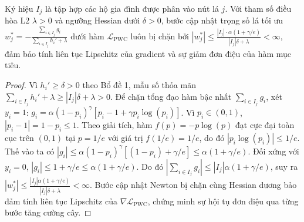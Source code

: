 \documentclass[conference]{IEEEtran}
\begin{document}
\begin{lemma}
Ký hiệu $I_j$ là tập hợp các hộ gia đình được phân vào nút lá $j$. Với tham số điều hòa L2 $\lambda > 0$ và ngưỡng Hessian dưới $\delta > 0$, bước cập nhật trọng số lá tối ưu $w_j^* = -\frac{\sum_{i \in I_j} g_i}{\sum_{i \in I_j} h_i' + \lambda}$ dưới hàm $\mathcal{L}_{\text{PWC}}$ luôn bị chặn bởi $|w_j^*| \le \frac{|I_j| \cdot \alpha (1 + \gamma / e)}{|I_j|\delta + \lambda} < \infty$, đảm bảo tính liên tục Lipschitz của gradient và sự giảm đơn điệu của hàm mục tiêu.
\end{lemma}
\begin{proof}
Vì $h_i' \ge \delta > 0$ theo Bổ đề 1, mẫu số thỏa mãn $\sum_{i \in I_j} h_i' + \lambda \ge |I_j|\delta + \lambda > 0$. Để chặn tổng đạo hàm bậc nhất $\sum_{i \in I_j} g_i$, xét $y_i=1$: $g_i = \alpha (1-p_i)^\gamma [p_i - 1 + \gamma p_i \log(p_i)]$. Vì $p_i \in (0, 1)$, $|p_i - 1| = 1-p_i \le 1$. Theo giải tích, hàm $f(p) = -p \log(p)$ đạt cực đại toàn cục trên $(0, 1)$ tại $p = 1/e$ với giá trị $f(1/e) = 1/e$, do đó $|p_i \log(p_i)| \le 1/e$. Thế vào ta có $|g_i| \le \alpha (1-p_i)^\gamma [ (1-p_i) + \gamma/e ] \le \alpha (1 + \gamma/e)$. Đối xứng với $y_i=0$, $|g_i| \le 1 + \gamma/e \le \alpha (1 + \gamma/e)$. Do đó $\left|\sum_{i \in I_j} g_i\right| \le |I_j| \alpha (1 + \gamma / e)$, suy ra $|w_j^*| \le \frac{|I_j| \alpha (1 + \gamma / e)}{|I_j|\delta + \lambda} < \infty$. Bước cập nhật Newton bị chặn cùng Hessian dương bảo đảm tính liên tục Lipschitz của $\nabla \mathcal{L}_{\text{PWC}}$, chứng minh sự hội tụ đơn điệu qua từng bước tăng cường cây.
\end{proof}
\end{document}
